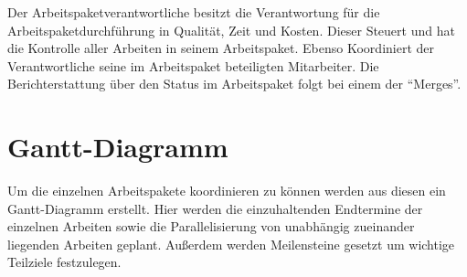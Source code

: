 Der Arbeitspaketverantwortliche besitzt die Verantwortung für die Arbeitspaketdurchführung in 
Qualität, Zeit und Kosten. Dieser Steuert und hat die Kontrolle aller Arbeiten in seinem 
Arbeitspaket. Ebenso Koordiniert der Verantwortliche seine im Arbeitspaket beteiligten Mitarbeiter. 
Die Berichterstattung über den Status im Arbeitspaket folgt bei einem der ``Merges''.
\newpar

\section{Gantt-Diagramm}
Um die einzelnen Arbeitspakete koordinieren zu können werden aus diesen ein Gantt-Diagramm 
erstellt. Hier werden die einzuhaltenden Endtermine der einzelnen Arbeiten sowie die 
Parallelisierung von unabhängig zueinander liegenden Arbeiten geplant. Außerdem werden Meilensteine 
gesetzt um wichtige Teilziele festzulegen. 